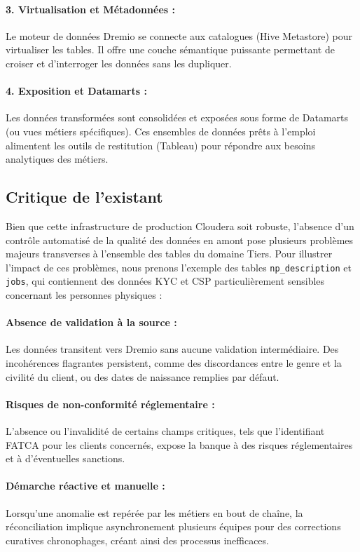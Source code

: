 \paragraph{3. Virtualisation et Métadonnées :} Le moteur de données Dremio se connecte aux catalogues (Hive Metastore) pour virtualiser les tables. Il offre une couche sémantique puissante permettant de croiser et d'interroger les données sans les dupliquer.

\paragraph{4. Exposition et Datamarts :} Les données transformées sont consolidées et exposées sous forme de Datamarts (ou vues métiers spécifiques). Ces ensembles de données prêts à l'emploi alimentent les outils de restitution (Tableau) pour répondre aux besoins analytiques des métiers.

\subsection{Critique de l'existant}
Bien que cette infrastructure de production Cloudera soit robuste, l'absence d'un contrôle automatisé de la qualité des données en amont pose plusieurs problèmes majeurs transverses à l'ensemble des tables du domaine Tiers. Pour illustrer l'impact de ces problèmes, nous prenons l'exemple des tables \texttt{np\_description} et \texttt{jobs}, qui contiennent des données KYC et CSP particulièrement sensibles concernant les personnes physiques :

\paragraph{Absence de validation à la source :} Les données transitent vers Dremio sans aucune validation intermédiaire. Des incohérences flagrantes persistent, comme des discordances entre le genre et la civilité du client, ou des dates de naissance remplies par défaut.

\paragraph{Risques de non-conformité réglementaire :} L'absence ou l'invalidité de certains champs critiques, tels que l'identifiant FATCA pour les clients concernés, expose la banque à des risques réglementaires et à d'éventuelles sanctions.

\paragraph{Démarche réactive et manuelle :} Lorsqu'une anomalie est repérée par les métiers en bout de chaîne, la réconciliation implique asynchronement plusieurs équipes pour des corrections curatives chronophages, créant ainsi des processus inefficaces.

